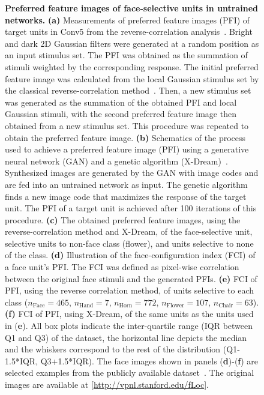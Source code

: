 \documentclass[final,3p,times,twocolumn]{elsarticle}
\begin{document}
\begin{figure}[htbp]
	
	\centering
	\caption{
		\textbf{Preferred feature images of face-selective units in untrained networks.
		}
		\textbf{(a)} Measurements of preferred feature images (PFI) of target units in Conv5 from the reverse-correlation analysis~\cite{bonin2011local}.
		Bright and dark 2D Gaussian filters were generated at a random position as an input stimulus set.
		The PFI was obtained as the summation of stimuli weighted by the corresponding response.
		The initial preferred feature image was calculated from the local Gaussian stimulus set by the classical reverse-correlation method~\cite{bonin2011local}.
		Then, a new stimulus set was generated as the summation of the obtained PFI and local Gaussian stimuli, with the second preferred feature image then obtained from a new stimulus set.
		This procedure was repeated to obtain the preferred feature image.
		\textbf{(b)} Schematics of the process used to achieve a preferred feature image (PFI) using a generative neural network (GAN) and a genetic algorithm (X-Dream)~\cite{ponce2019evolving}.
		Synthesized images are generated by the GAN with image codes and are fed into an untrained network as input.
		The genetic algorithm finds a new image code that maximizes the response of the target unit.
		The PFI of a target unit is achieved after 100 iterations of this procedure.
		\textbf{(c)} The obtained preferred feature images, using the reverse-correlation method and X-Dream, of the face-selective unit, selective units to non-face class (flower), and units selective to none of the class.
		\textbf{(d)} Illustration of the face-configuration index (FCI) of a face unit's PFI.
		The FCI was defined as pixel-wise correlation between the original face stimuli and the generated PFIs.
		\textbf{(e)} FCI of PFI, using the reverse correlation method, of units selective to each class ($ n_\textrm{Face} = 465 $, $ n_\textrm{Hand} = 7 $, $ n_\textrm{Horn} = 772 $, $ n_\textrm{Flower} = 107 $, $ n_\textrm{Chair} = 63 $).
		\textbf{(f)} FCI of PFI, using X-Dream, of the same units as the units used in (\textbf{e}).
		All box plots indicate the inter-quartile range (IQR between Q1 and Q3) of the dataset,
		the horizontal line depicts the median and the whiskers correspond to the rest of the distribution (Q1-1.5*IQR, Q3+1.5*IQR).
		The face images shown in panels (\textbf{d})-(\textbf{f}) are selected examples from the publicly available dataset~\cite{stigliani2015temporal}.
		The original images are available at [\url{http://vpnl.stanford.edu/fLoc}].
	}
	\label{fig:preferred}
\end{figure}
\end{document}
